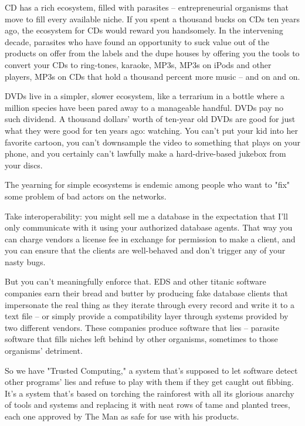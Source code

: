 CD has a rich ecosystem, filled with parasites -- entrepreneurial
organisms that move to fill every available niche. If you spent a
thousand bucks on CDs ten years ago, the ecosystem for CDs would
reward you handsomely. In the intervening decade, parasites who
have found an opportunity to suck value out of the products on
offer from the labels and the dupe houses by offering you the tools
to convert your CDs to ring-tones, karaoke, MP3s, MP3s on iPods and
other players, MP3s on CDs that hold a thousand percent more music
-- and on and on.

DVDs live in a simpler, slower ecosystem, like a terrarium in a
bottle where a million species have been pared away to a manageable
handful. DVDs pay no such dividend. A thousand dollars' worth of
ten-year old DVDs are good for just what they were good for ten
years ago: watching. You can't put your kid into her favorite
cartoon, you can't downsample the video to something that plays on
your phone, and you certainly can't lawfully make a
hard-drive-based jukebox from your discs.

The yearning for simple ecosystems is endemic among people who want
to "fix" some problem of bad actors on the networks.

Take interoperability: you might sell me a database in the
expectation that I'll only communicate with it using your
authorized database agents. That way you can charge vendors a
license fee in exchange for permission to make a client, and you
can ensure that the clients are well-behaved and don't trigger any
of your nasty bugs.

But you can't meaningfully enforce that. EDS and other titanic
software companies earn their bread and butter by producing fake
database clients that impersonate the real thing as they iterate
through every record and write it to a text file -- or simply
provide a compatibility layer through systems provided by two
different vendors. These companies produce software that lies --
parasite software that fills niches left behind by other organisms,
sometimes to those organisms' detriment.

So we have "Trusted Computing," a system that's supposed to let
software detect other programs' lies and refuse to play with them
if they get caught out fibbing. It's a system that's based on
torching the rainforest with all its glorious anarchy of tools and
systems and replacing it with neat rows of tame and planted trees,
each one approved by The Man as safe for use with his products.

